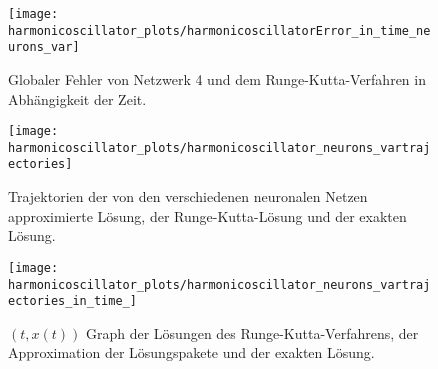 \begin{figure}
       \centering
       \texttt{[image: harmonicoscillator\_plots/harmonicoscillatorError\_in\_time\_neurons\_var]}
       \caption{Globaler Fehler von Netzwerk 4 und dem Runge-Kutta-Verfahren in Abhängigkeit der Zeit.}
       \label{fig:harmonic-neurons-variable-error-in-time}
\end{figure}
\begin{figure}
       \centering
       \texttt{[image: harmonicoscillator\_plots/harmonicoscillator\_neurons\_vartrajectories]}
       \caption{Trajektorien der von den verschiedenen neuronalen Netzen approximierte Lösung, der Runge-Kutta-Lösung
       und der exakten Lösung.}
       \label{fig:harmonic-neurons-variable-trajectories}
\end{figure}
\begin{figure}
       \centering
       \texttt{[image: harmonicoscillator\_plots/harmonicoscillator\_neurons\_vartrajectories\_in\_time\_]}
       \caption{$(t,x(t))$ Graph der Lösungen des Runge-Kutta-Verfahrens, der Approximation der
       Lösungspakete und der exakten Lösung.}
       \label{fig:harmonic-neurons-variable-trajectories-in-time}
\end{figure}

